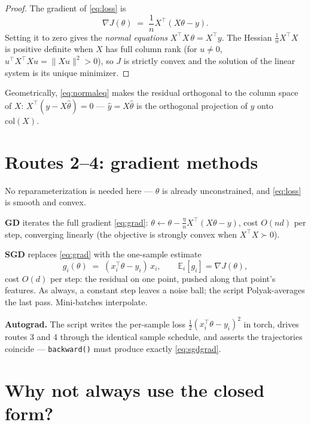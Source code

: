 \documentclass[11pt]{article}
\begin{document}
\begin{proof}
The gradient of \eqref{eq:loss} is
\begin{equation}
  \nabla J(\theta) \;=\; \frac1n X^\top (X\theta - y).
  \label{eq:grad}
\end{equation}
Setting it to zero gives the \emph{normal equations}
$X^\top X\,\theta = X^\top y$. The Hessian $\tfrac1n X^\top X$ is positive
definite when $X$ has full column rank (for $u \ne 0$,
$u^\top X^\top X u = \lVert Xu\rVert^2 > 0$), so $J$ is strictly convex
and the solution of the linear system is its unique minimizer.
\end{proof}

Geometrically, \eqref{eq:normaleq} makes the residual orthogonal to the
column space of $X$: $X^\top(y - X\hat\theta) = 0$ --- $\hat y = X\hat\theta$
is the orthogonal projection of $y$ onto $\mathrm{col}(X)$.

\section{Routes 2--4: gradient methods}

No reparameterization is needed here --- $\theta$ is already
unconstrained, and \eqref{eq:loss} is smooth and convex.

\textbf{GD} iterates the full gradient \eqref{eq:grad}:
$\theta \leftarrow \theta - \tfrac{\eta}{n} X^\top(X\theta - y)$, cost
$O(nd)$ per step, converging linearly (the objective is strongly convex
when $X^\top X \succ 0$).

\textbf{SGD} replaces \eqref{eq:grad} with the one-sample estimate
\begin{equation}
  g_i(\theta) \;=\; (x_i^\top\theta - y_i)\,x_i ,
  \qquad \mathbb{E}_i[g_i] = \nabla J(\theta),
  \label{eq:sgdgrad}
\end{equation}
cost $O(d)$ per step: the residual on one point, pushed along that point's
features. As always, a constant step leaves a noise ball; the script
Polyak-averages the last pass. Mini-batches interpolate.

\textbf{Autograd.} The script writes the per-sample loss
$\tfrac12(x_i^\top\theta-y_i)^2$ in torch, drives routes 3 and 4 through
the identical sample schedule, and asserts the trajectories coincide ---
\texttt{backward()} must produce exactly \eqref{eq:sgdgrad}.

\section{Why not always use the closed form?}
\end{document}
